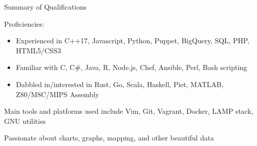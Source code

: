 \documentclass[letterpaper,10pt]{article}
\newif\ifrobots
\begin{document}
\begin{res_section}{Summary of Qualifications}
\begin{res_subsection}{Proficiencies:}
  \rmfamily
  \begin{itemize}
    \item Experienced in C++17, Javascript, Python, Puppet, BigQuery, SQL, PHP, HTML5/CSS3
    \item Familiar with C, C\#, Java, R, Node.js, Chef, Ansible, Perl, Bash scripting
    \item Dabbled in/interested in Rust, Go, Scala, Haskell, Piet, MATLAB, Z80/M8C/MIPS Assembly
  \end{itemize}
  \item Main tools and platforms used include Vim, Git, Vagrant, Docker, LAMP stack, GNU utilities
  \item Passionate about charts, graphs, mapping, and other beautiful data
 \ifrobots
  \item Continued personal experience working with microcontrollers and EDA (KiCad, Eagle)
 \fi
\end{res_subsection}
\end{res_section}
\end{document}
